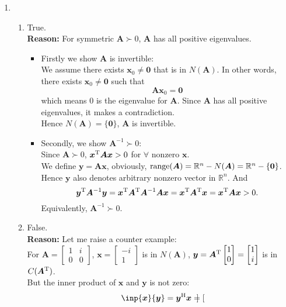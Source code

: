 \begin{enumerate}
\begin{enumerate}
$$\end{enumerate}
\item
\begin{enumerate}
\item
True.\\
\textbf{Reason: }For symmetric $\bm A\succ0$, $\bm A$ has all positive eigenvalues.
\begin{itemize}
\item
Firstly we show $\bm A$ is invertible:\\
We assume there exists $\bm x_0\ne\bm0$ that is in $N(\bm A)$. In other words, there exists $\bm x_0\ne\bm0$ such that
\[
\bm A\bm x_0=\bm0
\]
which means $0$ is the eigenvalue for $\bm A$. Since $\bm A$ has all positive eigenvalues, it makes a contradiction. \\Hence $N(\bm A)=\{\bm 0\}$, $\bm A$ is invertible.
\item
Secondly, we show $\bm A^{-1}\succ0$:\\
Since $\bm A\succ0$, $\bm x\trans\bm A\bm x>0$ for $\forall$ nonzero $\bm x$.\\
We define $\bm y=\bm{Ax}$, obviously, $\range(\bm A)=\mathbb{R}^{n}-N(\bm A)=\mathbb{R}^{n}-\{\bm0\}$.\\
Hence $\bm y$ also denotes arbitrary nonzero vector in $\mathbb{R}^{n}$. And
\[
\bm y\trans\bm A^{-1}\bm y=\bm x\trans\bm A\trans\bm A^{-1}\bm A\bm x=\bm x\trans\bm A\trans\bm x=\bm x\trans\bm A\bm x>0.
\]
Equivalently, $\bm A^{-1}\succ0.$ 
\end{itemize}
\item
False.\\
\textbf{Reason: }Let me raise a counter example: \\For $\bm A=\begin{bmatrix}
1&i\\0&0
\end{bmatrix}$, $\bm x=\begin{bmatrix}
-i\\1
\end{bmatrix}$ is in $N(\bm A)$, $\bm y=\bm A\trans\begin{bmatrix}
1\\0
\end{bmatrix}=\begin{bmatrix}
1\\i
\end{bmatrix}$ is in $C(\bm A\trans)$.\\
But the inner product of $\bm x$ and $\bm y$ is not zero:
\[
\inp{\bm x}{\bm y}=\bm y\Her\bm x=\begin{bmatrix}

\end{bmatrix}\]
\end{enumerate}
\end{enumerate}
